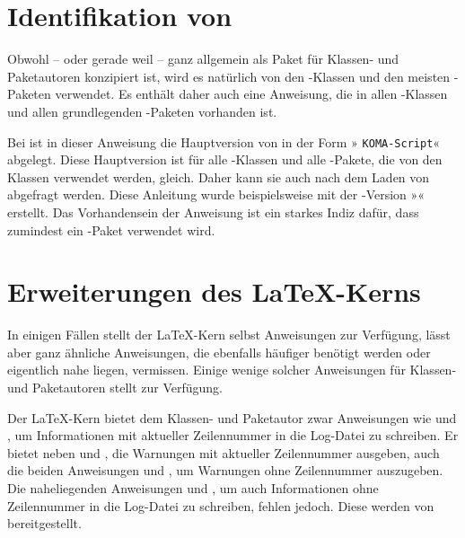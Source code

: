 \section{Identifikation von \KOMAScript}

Obwohl -- oder gerade weil --  ganz allgemein als Paket für
Klassen- und Paketautoren konzipiert ist, wird es natürlich von den
\KOMAScript-Klassen und den meisten \KOMAScript-Paketen verwendet. Es enthält
daher auch eine Anweisung, die in allen \KOMAScript-Klassen und allen
grundlegenden \KOMAScript-Paketen vorhanden ist.


\begin{Declaration}
\end{Declaration}
Bei \KOMAScript{} ist in dieser Anweisung die Hauptversion von \KOMAScript{}
in der Form »  \texttt{KOMA-Script}«
abgelegt. Diese Hauptversion ist für alle \KOMAScript-Klassen und alle
\KOMAScript-Pakete, die von den Klassen verwendet werden, gleich. Daher kann
sie auch nach dem Laden von  abgefragt werden. Diese
Anleitung wurde beispielsweise mit der \KOMAScript-Version
»\KOMAScriptVersion« erstellt. Das Vorhandensein der Anweisung ist ein
starkes Indiz dafür, dass zumindest ein \KOMAScript-Paket verwendet wird.%
\EndIndexGroup


\section{Erweiterungen des \LaTeX-Kerns}

In einigen Fällen stellt der \LaTeX-Kern selbst Anweisungen zur Verfügung,
lässt aber ganz ähnliche Anweisungen, die ebenfalls häufiger benötigt werden
oder eigentlich nahe liegen, vermissen. Einige wenige solcher Anweisungen
für Klassen- und Paketautoren stellt  zur Verfügung.

\begin{Declaration}
\end{Declaration}%
Der \LaTeX-Kern bietet dem Klassen- und Paketautor zwar Anweisungen wie
 und , um Informationen mit aktueller
Zeilennummer in die Log-Datei zu schreiben. Er bietet neben
 und , die Warnungen mit aktueller
Zeilennummer ausgeben, auch die beiden Anweisungen
 und , um Warnungen ohne
Zeilennummer auszugeben. Die naheliegenden Anweisungen
 und , um auch Informationen
ohne Zeilennummer in die Log-Datei zu schreiben, fehlen jedoch. Diese werden
von  bereitgestellt.
%
\EndIndexGroup


